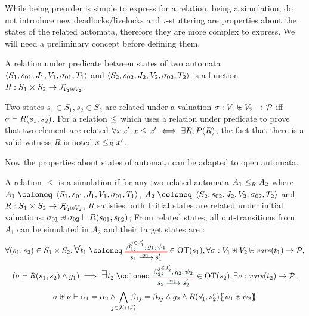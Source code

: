 \documentclass{article}
\begin{document}
While being preorder is simple to express for a relation, being a simulation, do not introduce new deadlocks/livelocks and \(\tau\)-stuttering are properties about the states of the related automata, therefore they are more complex to express.
We will need a preliminary concept before defining them.
\begin{defi}
A relation under predicate between states of two automata \(\OA{S_1}{s_{01}}{J_1}{V_1}{\sigma_{01}}{T_1}\) and \(\OA{S_2}{s_{02}}{J_2}{V_2}{\sigma_{02}}{T_2}\) is a function \(R: S_1 \times S_2 \to \rformulae[V_1 \uplus V_2]\).


Two states \(s_1 \in S_1, s_2 \in S_2\) are related under a  valuation \(\sigma: V_1 \uplus V_2 \to \values\) iff \(\sigma \vdash R\mpar{s_1, s_2}\).
For a relation \(\wrel{}{}{}\) which uses a relation under predicate to prove that two element are related \(\forall x \, x', x \wrel{}{}{} x' \iff \exists R, P\mpar{R}\), the fact that there is a valid witness \(R\) is noted \(\wrel{x}{x'}{R}\).
\end{defi}
Now the properties about states of automata can be adapted to open automata.
\begin{defi}
A relation \(\leq\) is a simulation if for any two related automata \(\wrel{A_1}{A_2}{R}\) where \(A_1 \defobject \OA{S_1}{s_{01}}{J_1}{V_1}{\sigma_{01}}{T_1}\), \(A_2 \defobject \OA{S_2}{s_{02}}{J_2}{V_2}{\sigma_{02}}{T_2}\) and \(R: S_1 \times S_2 \to \rformulae[V_1 \uplus V_2]\), \(R\) satisfies both
 Initial states are related under initial valuations: \(\sigma_{01} \uplus \sigma_{02} \vdash R\mpar{s_{01}, s_{02}}\);
 From related states, all out-transitions from \(A_1\) can be simulated in \(A_2\) and their target states are :
\begin{multline*}
	\forall \mpar{s_1, s_2} \in S_1 \times S_2, \bigsymb{\forall} t_1 \defobject \OTx{1}{}{1}{1} \in \fOT{s_1}, \forall \sigma: V_1 \uplus V_2 \uplus \fvars{t_1} \to \values, \\
	\mpar{\sigma \vdash R\mpar{s_1, s_2} \wedge g_1} \implies \bigsymb{\exists} t_2 \defobject \OTx{2}{}{2}{2} \in \fOT{s_2}, \exists \nu: \fvars{t_2} \to \values, \\
	\sigma \uplus \nu \vdash \alpha_1 = \alpha_2 \wedge \bigwedge_\subbox{j \in J'_1 \cap J'_2} \beta_{1j} = \beta_{2j} \wedge g_2 \wedge R\mpar{s'_1, s'_2}\psubst{\psi_1 \uplus \psi_2}
\end{multline*}
\end{defi}
\end{document}
